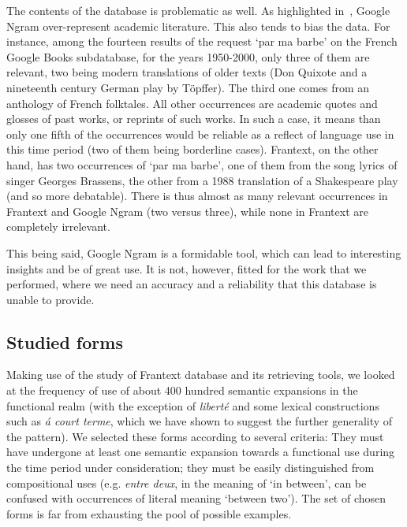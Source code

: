 \documentclass[12pt,twocolumn,amsmath,amssymb,aps,longbibliography]{revtex4-1}  %
\newcommand{\tit}{\textit}
\begin{document}
{{The contents of the database is problematic as well. As highlighted in~\cite{pechenick2015characterizing}, Google Ngram over-represent academic literature. This also tends to bias the data. For instance, among the fourteen results of the request `par ma barbe' on the French Google Books subdatabase, for the years 1950-2000, only three of them are relevant, two being modern translations of older texts (Don Quixote and a nineteenth century German play by T\"opffer). The third one comes from an anthology of French folktales. All other occurrences are academic quotes and glosses of past works, or reprints of such works. In such a case, it means than only one fifth of the occurrences would be reliable as a reflect of language use in this time period (two of them being borderline cases). Frantext, on the other hand, has two occurrences of `par ma barbe', one of them from the song lyrics of singer Georges Brassens, the other from a 1988 translation of a Shakespeare play (and so more debatable). There is thus almost as many relevant occurrences in Frantext and Google Ngram (two versus three), while none in Frantext are completely irrelevant. 

This being said, Google Ngram is a formidable tool, which can lead to interesting insights and be of great use. It is not, however, fitted for the work that we performed, where we need an accuracy and a reliability that this database is unable to provide. 

\subsection{Studied forms \label{A7}}

Making use of the study of Frantext database and its retrieving tools, we looked at the frequency of use of about 400 hundred semantic expansions in the functional realm (with the exception of \tit{libert\'e} and some lexical constructions such as \textit{\'a court terme}, which we have shown to suggest the further generality of the pattern). We selected these forms according to several criteria: They must have undergone at least one semantic expansion towards a functional use during the time period under consideration; they must be easily distinguished from compositional uses (e.g. \tit{entre deux}, in the meaning of `in between', can be confused with occurrences of literal meaning `between two'). The set of chosen forms is far from exhausting the pool of possible examples. 

}}
\end{document}
